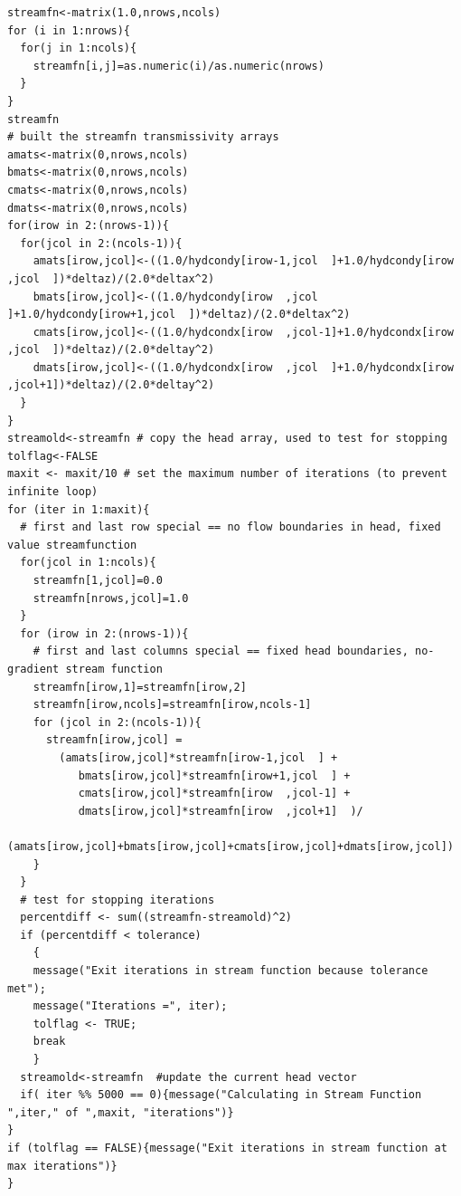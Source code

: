 \begin{lstlisting}[caption= Stream Function Script , label=lst:2DinclusionStream]
streamfn<-matrix(1.0,nrows,ncols)
for (i in 1:nrows){
  for(j in 1:ncols){
    streamfn[i,j]=as.numeric(i)/as.numeric(nrows)
  }
}
streamfn
# built the streamfn transmissivity arrays
amats<-matrix(0,nrows,ncols) 
bmats<-matrix(0,nrows,ncols) 
cmats<-matrix(0,nrows,ncols)
dmats<-matrix(0,nrows,ncols)
for(irow in 2:(nrows-1)){
  for(jcol in 2:(ncols-1)){
    amats[irow,jcol]<-((1.0/hydcondy[irow-1,jcol  ]+1.0/hydcondy[irow  ,jcol  ])*deltaz)/(2.0*deltax^2)
    bmats[irow,jcol]<-((1.0/hydcondy[irow  ,jcol  ]+1.0/hydcondy[irow+1,jcol  ])*deltaz)/(2.0*deltax^2)
    cmats[irow,jcol]<-((1.0/hydcondx[irow  ,jcol-1]+1.0/hydcondx[irow  ,jcol  ])*deltaz)/(2.0*deltay^2)
    dmats[irow,jcol]<-((1.0/hydcondx[irow  ,jcol  ]+1.0/hydcondx[irow  ,jcol+1])*deltaz)/(2.0*deltay^2)
  }
}
streamold<-streamfn # copy the head array, used to test for stopping 
tolflag<-FALSE
maxit <- maxit/10 # set the maximum number of iterations (to prevent infinite loop)
for (iter in 1:maxit){
  # first and last row special == no flow boundaries in head, fixed value streamfunction
  for(jcol in 1:ncols){
    streamfn[1,jcol]=0.0
    streamfn[nrows,jcol]=1.0
  }
  for (irow in 2:(nrows-1)){
    # first and last columns special == fixed head boundaries, no-gradient stream function
    streamfn[irow,1]=streamfn[irow,2]
    streamfn[irow,ncols]=streamfn[irow,ncols-1]
    for (jcol in 2:(ncols-1)){
      streamfn[irow,jcol] = 
        (amats[irow,jcol]*streamfn[irow-1,jcol  ] +
           bmats[irow,jcol]*streamfn[irow+1,jcol  ] +
           cmats[irow,jcol]*streamfn[irow  ,jcol-1] +
           dmats[irow,jcol]*streamfn[irow  ,jcol+1]  )/
        (amats[irow,jcol]+bmats[irow,jcol]+cmats[irow,jcol]+dmats[irow,jcol])
    }
  }
  # test for stopping iterations
  percentdiff <- sum((streamfn-streamold)^2)
  if (percentdiff < tolerance)
    {
    message("Exit iterations in stream function because tolerance met");
    message("Iterations =", iter);
    tolflag <- TRUE;
    break
    }
  streamold<-streamfn  #update the current head vector
  if( iter %% 5000 == 0){message("Calculating in Stream Function ",iter," of ",maxit, "iterations")}
}
if (tolflag == FALSE){message("Exit iterations in stream function at max iterations")}
}\end{lstlisting}















